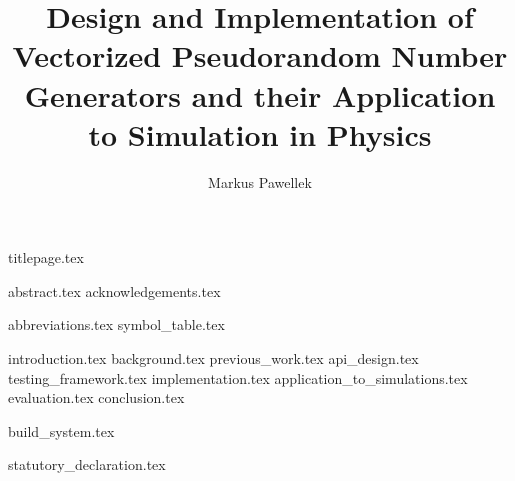 \documentclass[fleqn,10pt,twoside]{stdglobal}
\title{Design and Implementation of Vectorized Pseudorandom Number Generators and their Application to Simulation in Physics}
\author{Markus Pawellek}
\let\oldpagenumbering\pagenumbering
\renewcommand*\pagenumbering[1]{\cleardoublepage\oldpagenumbering{#1}}
\begin{document}

  {titlepage.tex}

  {abstract.tex}
  {acknowledgements.tex}

  \tableofcontents
  \listoffigures
  {abbreviations.tex}
  {symbol_table.tex}

  {introduction.tex}
  {background.tex}
  {previous_work.tex}
  {api_design.tex}
  {testing_framework.tex}
  {implementation.tex}
  {application_to_simulations.tex}
  {evaluation.tex}
  {conclusion.tex}
  \nocite{*}
  \printbibheading[heading=bibintoc]
  \printbibliography[notkeyword={c++},heading=subbibliography,title={General}]
  \printbibliography[keyword={c++},heading=subbibliography,title={Programming}]

  \appendix
  {build_system.tex}

  {statutory_declaration.tex}
\end{document}
